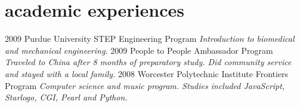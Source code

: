 \documentclass[]{cv}
\begin{document}
\section{academic experiences}

\begin{entrylist}
  \entry
    {2009}
    {Purdue University STEP Engineering Program}{}
    {\emph{Introduction to biomedical and mechanical engineering.}}
  \entry
    {2009}
    {People to People Ambassador Program}{}
    {\emph{Traveled to China after 8 months of preparatory study. Did community service and stayed with a local family.}}
  \entry
    {2008}
    {Worcester Polytechnic Institute Frontiers Program}{}
    {\emph{Computer science and music program. Studies included JavaScript, Starlogo, CGI, Pearl and Python.}}
\end{entrylist}
\end{document}

